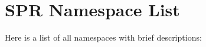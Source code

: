 \section{SPR Namespace List}
Here is a list of all namespaces with brief descriptions:\begin{CompactList}
\item{}
\end{CompactList}
